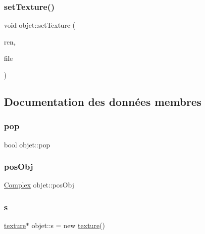 \mbox{\label{classobjet_ac741f7e1b5d8bcb2174e698b801cdd24}} 
\subsubsection{\texorpdfstring{set\+Texture()}{setTexture()}}
{\footnotesize\ttfamily void objet\+::set\+Texture (\begin{DoxyParamCaption}\item[{S\+D\+L\+\_\+\+Renderer $\ast$}]{ren,  }\item[{const char $\ast$}]{file }\end{DoxyParamCaption})}



\subsection{Documentation des données membres}
\mbox{\label{classobjet_a0e1c8a51f415667f4b612b951bb401b8}} 
\subsubsection{\texorpdfstring{pop}{pop}}
{\footnotesize\ttfamily bool objet\+::pop\hspace{0.3cm}{\ttfamily [protected]}}

\mbox{\label{classobjet_a439fb5a8f7648ce62e31b9027c707742}} 
\subsubsection{\texorpdfstring{pos\+Obj}{posObj}}
{\footnotesize\ttfamily \hyperlink{classComplex}{Complex} objet\+::pos\+Obj\hspace{0.3cm}{\ttfamily [protected]}}

\mbox{\label{classobjet_aeeaf84712cb013837845cac02ebe2b1e}} 
\subsubsection{\texorpdfstring{s}{s}}
{\footnotesize\ttfamily \hyperlink{classtexture}{texture}$\ast$ objet\+::s = new \hyperlink{classtexture}{texture}()\hspace{0.3cm}{\ttfamily [protected]}}




